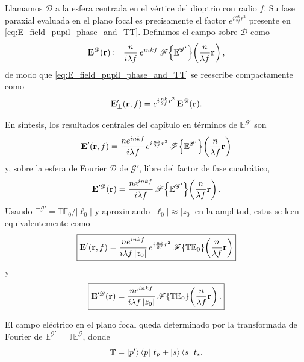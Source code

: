 Llamamos $\mathscr{D}$ a la esfera centrada en el vértice del dioptrio con radio $f$. Su fase paraxial evaluada en el plano focal es precisamente el factor $e^{i\frac{nk}{2f}r^2}$ presente en \eqref{eq:E_field_pupil_phase_and_TT}. Definimos el campo sobre $\mathscr{D}$ como
\begin{equation}
  \vb E^{\mathscr D}(\vb r)
  \coloneqq
  \frac{n}{i\lambda f}\,e^{inkf}
  \,\mathscr F\!\left\{\mathbb E^{\mathscr G'}\right\}
  \!\left(\frac{n}{\lambda f}\vb r\right),
  \label{eq:E_D_def}
\end{equation}
de modo que \eqref{eq:E_field_pupil_phase_and_TT} se reescribe compactamente como
\begin{equation}
  \vb E'_\perp(\vb r, f)
  =
  e^{i\frac{nk}{2f}r^2}\,
  \vb E^{\mathscr D}(\vb r).
  \label{eq:E_field_as_Debye}
\end{equation}

En síntesis, los resultados centrales del capítulo en términos de $\mathbb E^{\mathscr G'}$ son
\begin{equation}
  \vb E'(\vb r, f)
  =
  \frac{ne^{inkf}}{i\lambda f}e^{i\frac{nk}{2f}r^2}
  \,\mathscr F\!\left\{\mathbb E^{\mathscr G'}\right\}\!\left(\frac{n}{\lambda f}\vb r\right)
  \label{eq:E_field_in_EGp}
\end{equation}
y, sobre la esfera de Fourier $\mathscr D$ de $\mathscr G'$, libre del factor de fase cuadrático,
\begin{equation}
  \vb E'^{\mathscr D}(\vb r)
  =
  \frac{n e^{inkf}}{i\lambda f}  \,\mathscr F\!\left\{\mathbb E^{\mathscr G'}\right\}\!\left(\frac{n}{\lambda f}\vb r\right).
  \label{eq:E_D_in_EGp}
\end{equation}
Usando $\mathbb E^{\mathscr G'} = \mathbb T \mathbb E_0 / |\ell_0|$ y aproximando $|\ell_0| \approx |z_0|$ en la amplitud, estas se leen equivalentemente como
\begin{equation}
\boxed{
  \vb E'(\vb r, f)
  =
  \frac{ne^{inkf}}{i\lambda f\,|z_0|}\,e^{i\frac{nk}{2f}r^2}\,\mathscr F\!\left\{\mathbb T\mathbb E_0\right\}\!\left(\frac{n}{\lambda f}\vb r\right)
}
  \label{eq:E_prime_func_of_M_E0}
\end{equation}
y
\begin{equation}
\boxed{
  \vb E'^{\mathscr D}(\vb r)
  =
  \frac{ne^{inkf}}{i\lambda f\,|z_0|}  \,\mathscr F\!\left\{\mathbb T\mathbb E_0\right\}\!\left(\frac{n}{\lambda f}\vb r\right).
}
  \label{eq:E_prime_D_function_of_M_E0}
\end{equation}

El campo eléctrico en el plano focal queda determinado por la transformada de Fourier de $\mathbb E^{\mathscr G'} = \mathbb T \mathbb E^{\mathscr G}$, donde
\begin{equation}
  \mathbb T
  =
  \ket{p'} \bra p\, t_p
  +
  \ket{s} \bra s\, t_s.
  \label{eq:def_M_bb}
\end{equation}

